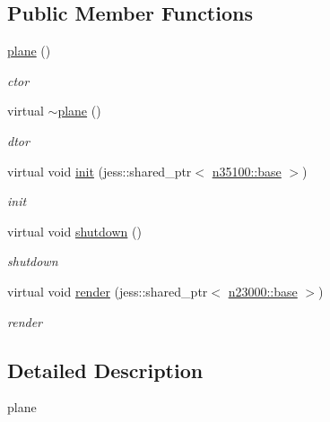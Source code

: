 \subsection*{Public Member Functions}
\begin{DoxyCompactItemize}
\item 
\hyperlink{classnebula_1_1content_1_1shape_1_1renderer_1_1plane_a4294d287f8de066619bd95c08a20aa8a}{plane} ()
\begin{DoxyCompactList}\small\item\em ctor \item\end{DoxyCompactList}\item 
virtual \hyperlink{classnebula_1_1content_1_1shape_1_1renderer_1_1plane_a7b467011f296865587b149b629c3b5e6}{$\sim$plane} ()
\begin{DoxyCompactList}\small\item\em dtor \item\end{DoxyCompactList}\item 
virtual void \hyperlink{classnebula_1_1content_1_1shape_1_1renderer_1_1plane_a145d3d5df479fd13eb58332b1c5e4a72}{init} (jess::shared\_\-ptr$<$ \hyperlink{classnebula_1_1content_1_1shape_1_1admin_1_1base}{n35100::base} $>$)
\begin{DoxyCompactList}\small\item\em init \item\end{DoxyCompactList}\item 
virtual void \hyperlink{classnebula_1_1content_1_1shape_1_1renderer_1_1plane_ae5a310f6e36f4798770fae0aec97d20c}{shutdown} ()
\begin{DoxyCompactList}\small\item\em shutdown \item\end{DoxyCompactList}\item 
virtual void \hyperlink{classnebula_1_1content_1_1shape_1_1renderer_1_1plane_ac47d793f33f2b37ffd386c06bcc4cc53}{render} (jess::shared\_\-ptr$<$ \hyperlink{classnebula_1_1platform_1_1renderer_1_1base}{n23000::base} $>$)
\begin{DoxyCompactList}\small\item\em render \item\end{DoxyCompactList}\end{DoxyCompactItemize}


\subsection{Detailed Description}
plane 

